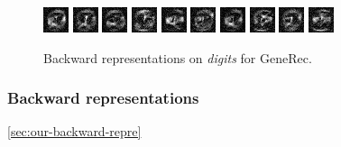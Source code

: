 \begin{figure}[H]
  \centering
  \includegraphics{../presentation/img/dig_0.png} %
  \includegraphics{../presentation/img/dig_1.png} 
  \includegraphics{../presentation/img/dig_2.png} 
  \includegraphics{../presentation/img/dig_3.png} 
  \includegraphics{../presentation/img/dig_4.png} 
  \includegraphics{../presentation/img/dig_5.png} 
  \includegraphics{../presentation/img/dig_6.png} 
  \includegraphics{../presentation/img/dig_7.png} 
  \includegraphics{../presentation/img/dig_8.png} 
  \includegraphics{../presentation/img/dig_9.png} 
  \caption{Backward representations on \emph{digits} for GeneRec.}
  \label{fig:results-backward-repre-generec}
\end{figure}


\subsubsection{Backward representations} 
\ref{sec:our-backward-repre} 

